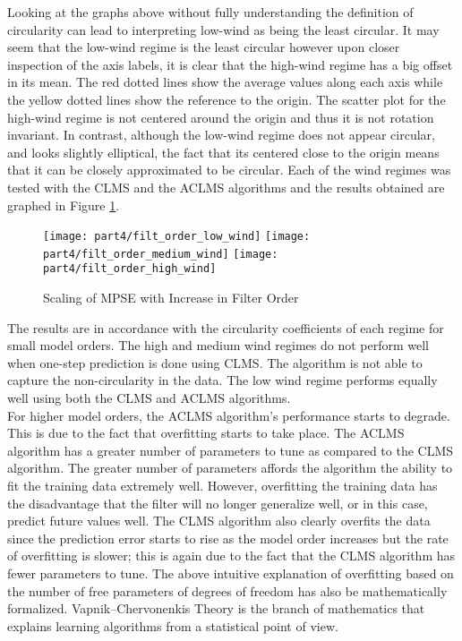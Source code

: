 \noindent{}Looking at the graphs above without fully understanding the definition of circularity can lead to interpreting low-wind as being the least circular. It may seem that the low-wind regime is the least circular however upon closer inspection of the axis labels, it is clear that the high-wind regime has a big offset in its mean. The red dotted lines show the average values along each axis while the yellow dotted lines show the reference to the origin. The scatter plot for the high-wind regime is not centered around the origin and thus it is not rotation invariant. In contrast, although the low-wind regime does not appear circular, and looks slightly elliptical, the fact that its centered close to the origin means that it can be closely approximated to be circular. Each of the wind regimes was tested with the CLMS and the ACLMS algorithms and the results obtained are graphed in Figure \ref{fig:wind_order}.

\begin{figure}[H]
\centering{}
\texttt{[image: part4/filt\_order\_low\_wind]}
\texttt{[image: part4/filt\_order\_medium\_wind]}
\texttt{[image: part4/filt\_order\_high\_wind]}
\caption{Scaling of MPSE with Increase in Filter Order}
\label{fig:wind_order}
\end{figure}

\noindent{}The results are in accordance with the circularity coefficients of each regime for small model orders. The high and medium wind regimes do not perform well when one-step prediction is done using CLMS. The algorithm is not able to capture the non-circularity in the data. The low wind regime performs equally well using both the CLMS and ACLMS algorithms.\\

\noindent{}For higher model orders, the ACLMS algorithm's performance starts to degrade. This is due to the fact that overfitting starts to take place. The ACLMS algorithm has a greater number of parameters to tune as compared to the CLMS algorithm. The greater number of parameters affords the algorithm the ability to fit the training data extremely well. However, overfitting the training data has the disadvantage that the filter will no longer generalize well, or in this case, predict future values well. The CLMS algorithm also clearly overfits the data since the prediction error starts to rise as the model order increases but the rate of overfitting is slower; this is again due to the fact that the CLMS algorithm has fewer parameters to tune. The above intuitive explanation of overfitting based on the number of free parameters of degrees of freedom has also be mathematically formalized. Vapnik–Chervonenkis Theory is the branch of mathematics that explains learning algorithms from a statistical point of view. \\

